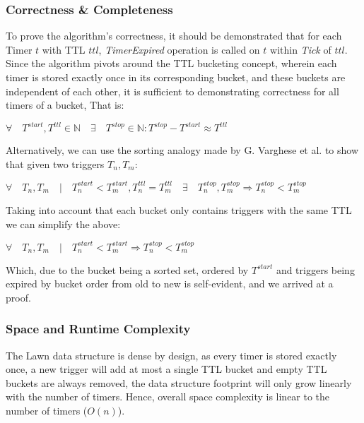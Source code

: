 \documentclass[conference]{IEEEtran}
\begin{document}
\subsubsection{Correctness \& Completeness}
To prove the algorithm's correctness, it should be demonstrated that for each Timer $t$ with TTL $ttl$,  \textit{TimerExpired} operation is called on $t$ within \textit{Tick} of $ttl$. Since the algorithm pivots around the TTL bucketing concept, wherein each timer is stored exactly once in its corresponding bucket, and these buckets are independent of each other, it is sufficient to demonstrating correctness for all timers of a bucket, That is:
\begin{center}
	$\forall \quad T^{start}, T^{ttl} \in \mathbb{N} \quad \exists \quad T^{stop} \in \mathbb{N} : T^{stop}-T^{start} \approx T^{ttl}$
\end{center}

Alternatively, we can use the sorting analogy made by G. Varghese et al.\cite{TW} to show that given two triggers $T_n, T_m$: 

\begin{center}
	$\forall \quad T_n, T_m \quad | \quad T^{start}_n<T^{start}_m,  T^{ttl}_n = T^{ttl}_m \quad \exists\quad T^{stop}_n, T^{stop}_m  \Rightarrow T^{stop}_n < T^{stop}_m$
\end{center}

Taking into account that each bucket only contains triggers with the same TTL we can simplify the above:

\begin{center}
	$\forall \quad T_n, T_m \quad | \quad T^{start}_n<T^{start}_m \Rightarrow T^{stop}_n < T^{stop}_m$
\end{center}

Which, due to the bucket being a sorted set, ordered by $T^{start}$ and triggers being expired by bucket order from old to new is self-evident, and we arrived at a proof.

\subsubsection{Space and Runtime Complexity}
The Lawn data structure is dense by design, as every timer is stored exactly once, a new trigger will add at most a single TTL bucket and empty TTL buckets are always removed, the data structure footprint will only grow linearly with the number of timers. Hence, overall space complexity is linear to the number of timers ($O(n)$). 
\end{document}
